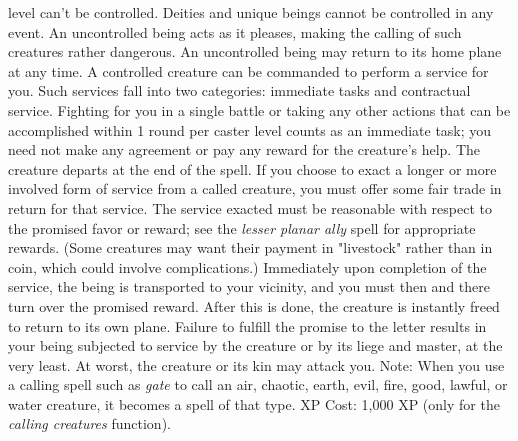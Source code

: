 level can't be controlled. Deities and unique beings cannot be controlled in any
event. An uncontrolled being acts as it pleases, making the calling of such creatures
rather dangerous. An uncontrolled being may return to its home plane at any time.
A controlled creature can be commanded to perform a service for you. Such services
fall into two categories: immediate tasks and contractual service. Fighting for
you in a single battle or taking any other actions that can be accomplished within
1 round per caster level counts as an immediate task; you need not make any agreement
or pay any reward for the creature's help. The creature departs at the end of the
spell.
If you choose to exact a longer or more involved form of service from a called
creature, you must offer some fair trade in return for that service. The service
exacted must be reasonable with respect to the promised favor or reward; see the
\textit{lesser planar ally} spell for appropriate rewards. (Some creatures may
want their payment in "livestock" rather than in coin, which could involve complications.)
Immediately upon completion of the service, the being is transported to your vicinity,
and you must then and there turn over the promised reward. After this is done,
the creature is instantly freed to return to its own plane.
Failure to fulfill the promise to the letter results in your being subjected to
service by the creature or by its liege and master, at the very least. At worst,
the creature or its kin may attack you.
Note: When you use a calling spell such as \textit{gate} to call an air,
chaotic, earth, evil, fire, good, lawful, or water creature, it becomes a spell
of that type.
XP Cost: 1,000 XP (only for the \textit{calling creatures} function).
